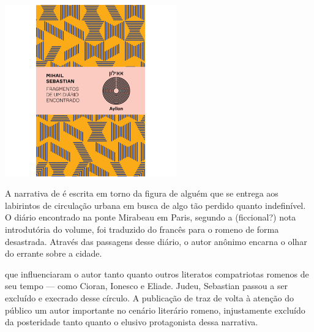 \begin{center}
\hspace*{-3.6cm}
\hspace*{3.1cm}\includegraphics[width=74mm]{./grid/sebastian.jpg}
\end{center}

\hspace*{-7cm}\hrulefill\hspace*{-7cm}

\medskip

\noindent{}A narrativa de {} é escrita em torno da figura de alguém que se entrega aos labirintos de circulação urbana em busca de algo tão perdido quanto indefinível. O diário encontrado na ponte Mirabeau em Paris, segundo a (ficcional?) nota introdutória do volume, foi traduzido do francês para o romeno de forma desastrada. Através das passagens desse diário, o autor anônimo encarna o olhar do errante sobre a cidade.

 que influenciaram o autor tanto quanto outros literatos compatriotas romenos de seu tempo --- como Cioran, Ionesco e Eliade. Judeu, Sebastian passou a ser excluído e execrado desse círculo. A publicação de {} traz de volta à atenção do público um autor importante no cenário literário romeno, injustamente excluído da posteridade tanto quanto o elusivo protagonista dessa narrativa.

\vfill

\hspace*{-.4cm}\begin{minipage}[c]{1\linewidth}
\small{
{}}
\end{minipage}


